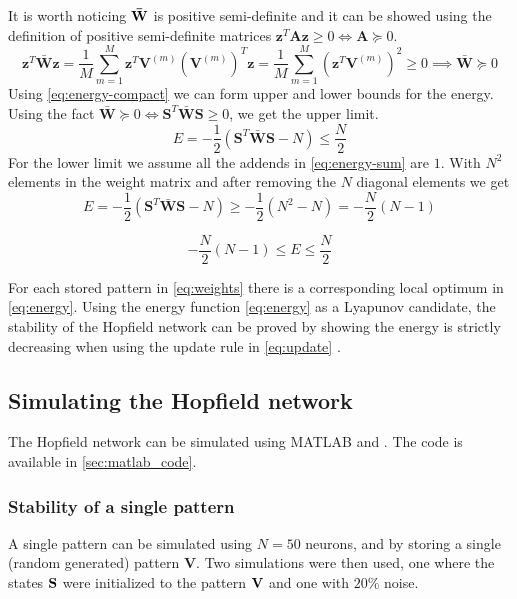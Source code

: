 It is worth noticing $\bf \bar{W}$ is positive semi-definite and it can be showed using the definition of positive semi-definite matrices $\mathbf{z}^T \mathbf{A} \mathbf{z} \geq 0 \iff \mathbf{A} \succeq 0$.
\begin{equation*}
\mathbf{z}^T\bar{\mathbf{W}} \mathbf{z} = \frac{1}{M}\sum_{m=1}^M \mathbf{z}^T \mathbf{V}^{(m)}(\mathbf{V}^{(m)})^T \mathbf{z} = \frac{1}{M}\sum_{m=1}^M (\mathbf{z}^T \mathbf{V}^{(m)})^2 \geq 0 \implies \mathbf{\bar{W}} \succeq 0
\end{equation*}
Using \cref{eq:energy-compact} we can form upper and lower bounds for the energy. Using the fact $\mathbf{\bar{W}} \succeq 0 \iff \mathbf{S}^T \mathbf{\bar{W}}\mathbf{S} \geq 0$, we get the upper limit.
\begin{equation*}
    E = -\frac{1}{2}(\mathbf{S}^T \bar{\mathbf{W}} \mathbf{S} - N) \leq \frac{N}{2}
\end{equation*}
For the lower limit we assume all the addends in \cref{eq:energy-sum} are $1$. With $N^2$ elements in the weight matrix and after removing the $N$ diagonal elements we get
\begin{equation*}
    E = -\frac{1}{2}(\mathbf{S}^T \bar{\mathbf{W}} \mathbf{S} - N) \geq -\frac{1}{2} (N^2 - N) = -\frac{N}{2} (N-1) 
\end{equation*}

\begin{tcolorbox}[title={Energy Limits}]
    \begin{equation}\label{eq:energy-limits}
        -\frac{N}{2}(N-1) \leq E \leq \frac{N}{2}
    \end{equation}
\end{tcolorbox}

For each stored pattern in \cref{eq:weights} there is a corresponding local optimum in \cref{eq:energy}.
Using the energy function \cref{eq:energy} as a Lyapunov candidate, the stability of the Hopfield network can be proved by showing the energy is strictly decreasing when using the update rule in \cref{eq:update} \cite{lyapnuv-stability}.




\subsection{Simulating the Hopfield network}
The Hopfield network can be simulated using MATLAB and . The code is available in \cref{sec:matlab_code}.
\subsubsection*{Stability of a single pattern}
A single pattern can be simulated using $N=50$ neurons, and by storing a single (random generated) pattern $\mathbf{V}$. Two simulations were then used, one where the states $\bf S$ were initialized to the pattern $\bf V$ and one with $20\%$ noise.
